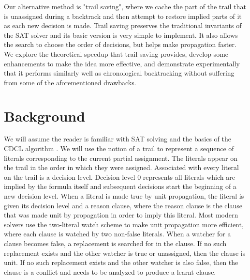 \documentclass[runningheads]{llncs}
\renewcommand{\note}[1]{{\color{red}{#1}}}
\begin{document}
Our alternative method is "trail saving", where we cache the part of
the trail that is unassigned during a backtrack and then attempt to
restore implied parts of it as each new decision is made. Trail saving
preserves the traditional invariants of the SAT solver and its basic
version is very simple to implement. It also allows the search to
choose the order of decisions, but helps make propagation faster. We
explore the theoretical speedup that trail saving provides, develop
some enhancements to make the idea more effective, and demonstrate
experimentally that it performs similarly well as chronological
backtracking without suffering from some of the aforementioned
drawbacks.

\section{Background}
\note{elaborate backtrack after learning a clause. Also describe
  properties of the trail (a) reason valid every reason clause is made
  unit by its prefix, (b) non-contradictory, (c) non-conflicting (no
  clause is falsified), and (d) propagation complete }

We will assume the reader is familiar with SAT solving and the basics
of the CDCL algorithm \cite{DBLP:series/faia/SilvaLM09}. We will use
the notion of a trail to represent a sequence of literals
corresponding to the current partial assignment. The literals appear
on the trail in the order in which they were assigned. Associated with
every literal on the trail is a decision level. Decision level 0
represents all literals which are implied by the formula itself and
subsequent decisions start the beginning of a new decision level. When
a literal is made true by unit propagation, the literal is given its
decision level and a reason clause, where the reason clause is the
clause that was made unit by propagation in order to imply this
literal. Most modern solvers use the two-literal watch scheme to make
unit propagation more efficient, where each clause is watched by two
non-false literals. When a watcher for a clause becomes false, a
replacement is searched for in the clause. If no such replacement
exists and the other watcher is true or unassigned, then the clause is
unit. If no such replacement exists and the other watcher is also
false, then the clause is a conflict and needs to be analyzed to
produce a learnt clause.
\end{document}
